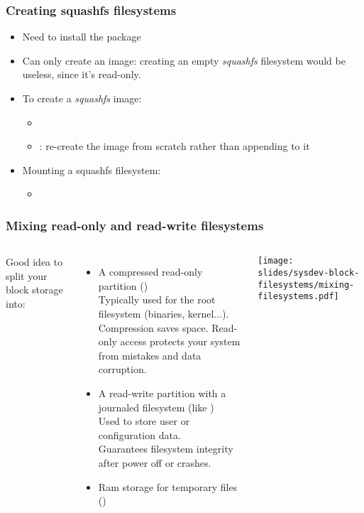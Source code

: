 \begin{frame}
  \frametitle{Creating squashfs filesystems}
  \begin{itemize}
  \item Need to install the  package
  \item Can only create an image: creating an empty {\em squashfs}
    filesystem would be useless, since it's read-only.
  \item To create a {\em squashfs} image:
    \begin{itemize}
    \item {}
    \item {}: re-create the image from scratch rather
      than appending to it
    \end{itemize}
  \item Mounting a squashfs filesystem:
    \begin{itemize}
    \item {}
    \end{itemize}
  \end{itemize}
\end{frame}

\begin{frame}
  \frametitle{Mixing read-only and read-write filesystems}
  \begin{columns}
    Good idea to split your block storage into:
    \begin{itemize}
    \item A compressed read-only partition ()\\
      Typically used for the root filesystem (binaries, kernel...).\\
      Compression saves space. Read-only access protects your system
      from mistakes and data corruption.
    \item A read-write partition with a journaled filesystem (like )\\
      Used to store user or configuration data.\\
      Guarantees filesystem integrity after power off or crashes.
    \item Ram storage for temporary files ()
    \end{itemize}
    \texttt{[image: slides/sysdev-block-filesystems/mixing-filesystems.pdf]}
  \end{columns}
\end{frame}


